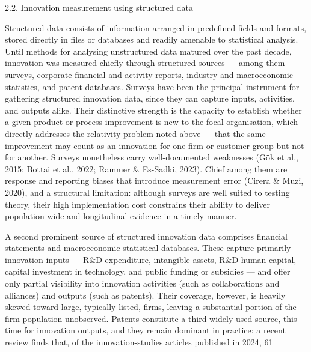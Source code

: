 \documentclass[runningheads]{llncs}
\begin{document}
2.2. Innovation measurement using structured data

Structured data consists of information arranged in predefined fields and formats, stored directly in files or databases and readily amenable to statistical analysis. Until methods for analysing unstructured data matured over the past decade, innovation was measured chiefly through structured sources — among them surveys, corporate financial and activity reports, industry and macroeconomic statistics, and patent databases. Surveys have been the principal instrument for gathering structured innovation data, since they can capture inputs, activities, and outputs alike. Their distinctive strength is the capacity to establish whether a given product or process improvement is new to the focal organisation, which directly addresses the relativity problem noted above — that the same improvement may count as an innovation for one firm or customer group but not for another. Surveys nonetheless carry well-documented weaknesses (Gök et al., 2015; Bottai et al., 2022; Rammer & Es-Sadki, 2023). Chief among them are response and reporting biases that introduce measurement error (Cirera & Muzi, 2020), and a structural limitation: although surveys are well suited to testing theory, their high implementation cost constrains their ability to deliver population-wide and longitudinal evidence in a timely manner.

A second prominent source of structured innovation data comprises financial statements and macroeconomic statistical databases. These capture primarily innovation inputs — R&D expenditure, intangible assets, R&D human capital, capital investment in technology, and public funding or subsidies — and offer only partial visibility into innovation activities (such as collaborations and alliances) and outputs (such as patents). Their coverage, however, is heavily skewed toward large, typically listed, firms, leaving a substantial portion of the firm population unobserved.
Patents constitute a third widely used source, this time for innovation outputs, and they remain dominant in practice: a recent review finds that, of the innovation-studies articles published in 2024, 61%
\end{document}
